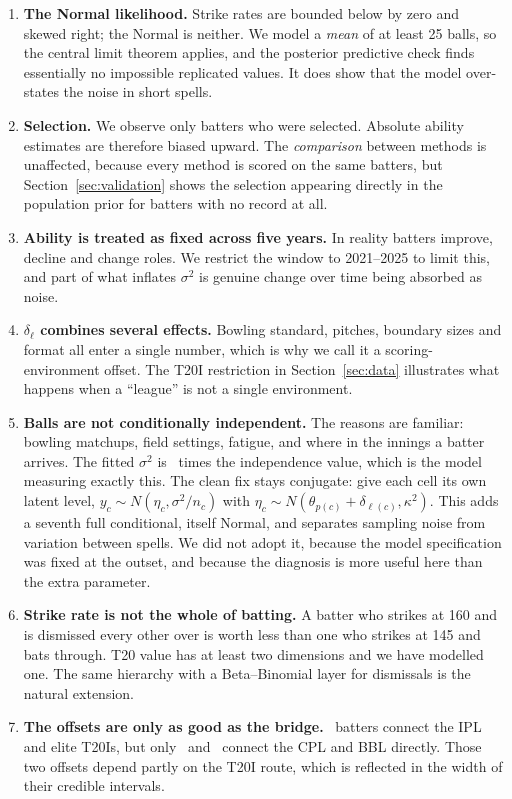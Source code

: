 \documentclass[11pt,a4paper]{article}
\begin{document}
\begin{enumerate}
\item \textbf{The Normal likelihood.} Strike rates are bounded below by zero and skewed right;
the Normal is neither. We model a \emph{mean} of at least 25 balls, so the central limit
theorem applies, and the posterior predictive check finds essentially no impossible replicated
values. It does show that the model over-states the noise in short spells.

\item \textbf{Selection.} We observe only batters who were selected. Absolute ability
estimates are therefore biased upward. The \emph{comparison} between methods is unaffected,
because every method is scored on the same batters, but Section~\ref{sec:validation} shows the
selection appearing directly in the population prior for batters with no record at all.

\item \textbf{Ability is treated as fixed across five years.} In reality batters improve,
decline and change roles. We restrict the window to 2021--2025 to limit this, and part of what
inflates $\sigma^2$ is genuine change over time being absorbed as noise.

\item \textbf{$\delta_\ell$ combines several effects.} Bowling standard, pitches, boundary
sizes and format all enter a single number, which is why we call it a scoring-environment
offset. The T20I restriction in Section~\ref{sec:data} illustrates what happens when a
``league'' is not a single environment.

\item \textbf{Balls are not conditionally independent.} The reasons are familiar: bowling
matchups, field settings, fatigue, and where in the innings a batter arrives. The fitted
$\sigma^2$ is \ndesignEffect\
times the independence value, which is the model measuring exactly this. The clean fix stays
conjugate: give each cell its own latent level, $y_c \sim N(\eta_c, \sigma^2/n_c)$ with
$\eta_c \sim N(\theta_{p(c)} + \delta_{\ell(c)}, \kappa^2)$. This adds a seventh full
conditional, itself Normal, and separates sampling noise from variation between spells. We did
not adopt it, because the model specification was fixed at the outset, and because the
diagnosis is more useful here than the extra parameter.

\item \textbf{Strike rate is not the whole of batting.} A batter who strikes at 160 and is
dismissed every other over is worth less than one who strikes at 145 and bats through. T20 value
has at least two dimensions and we have modelled one. The same hierarchy with a Beta--Binomial
layer for dismissals is the natural extension.

\item \textbf{The offsets are only as good as the bridge.} \nbridgeIplTtwoi\ batters connect
the IPL and elite T20Is, but only \nbridgeIplCpl\ and \nbridgeIplBbl\ connect the CPL and BBL
directly. Those two offsets depend partly on the T20I route, which is reflected in the width of
their credible intervals.
\end{enumerate}
\end{document}
